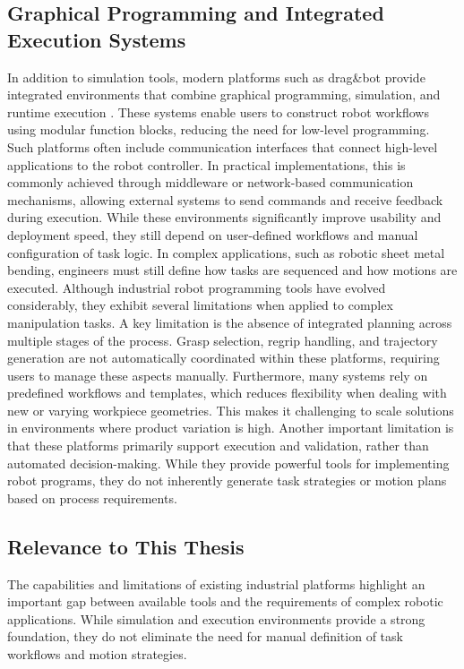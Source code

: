 \subsection{Graphical Programming and Integrated Execution Systems}
In addition to simulation tools, modern platforms such as drag\&bot provide integrated environments that combine graphical programming, simulation, and runtime execution \cite{dragandbot_anyrobot_2025}. These systems enable users to construct robot workflows using modular function blocks, reducing the need for low-level programming.
Such platforms often include communication interfaces that connect high-level applications to the robot controller. In practical implementations, this is commonly achieved through middleware or network-based communication mechanisms, allowing external systems to send commands and receive feedback during execution.
While these environments significantly improve usability and deployment speed, they still depend on user-defined workflows and manual configuration of task logic. In complex applications, such as robotic sheet metal bending, engineers must still define how tasks are sequenced and how motions are executed.
 Although industrial robot programming tools have evolved considerably, they exhibit several limitations when applied to complex manipulation tasks.
A key limitation is the absence of integrated planning across multiple stages of the process. Grasp selection, regrip handling, and trajectory generation are not automatically coordinated within these platforms, requiring users to manage these aspects manually.
Furthermore, many systems rely on predefined workflows and templates, which reduces flexibility when dealing with new or varying workpiece geometries. This makes it challenging to scale solutions in environments where product variation is high.
Another important limitation is that these platforms primarily support execution and validation, rather than automated decision-making. While they provide powerful tools for implementing robot programs, they do not inherently generate task strategies or motion plans based on process requirements.
\subsection{Relevance to This Thesis}
The capabilities and limitations of existing industrial platforms highlight an important gap between available tools and the requirements of complex robotic applications. While simulation and execution environments provide a strong foundation, they do not eliminate the need for manual definition of task workflows and motion strategies.
 
